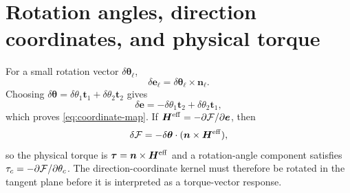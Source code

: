 \section{Rotation angles, direction coordinates, and physical torque}
\label{app:coordinates}

For a small rotation vector $\delta\bm\theta_\ell$,
\begin{equation}
\delta\bm e_\ell=\delta\bm\theta_\ell\times\bm n_\ell.
\end{equation}
Choosing $\delta\bm\theta=\delta\theta_1\bm t_1+\delta\theta_2\bm t_2$ gives
\begin{equation}
\delta\bm e=-\delta\theta_1\bm t_2+\delta\theta_2\bm t_1,
\end{equation}
which proves \cref{eq:coordinate-map}. If $\bm H^{\rm eff}=-\partial\mathcal F/\partial\bm e$, then
\begin{equation}
\delta\mathcal F=-\delta\bm\theta\cdot
(\bm n\times\bm H^{\rm eff}),
\end{equation}
so the physical torque is $\bm\tau=\bm n\times\bm H^{\rm eff}$ and a rotation-angle component satisfies $\tau_c=-\partial\mathcal F/\partial\theta_c$. The direction-coordinate kernel must therefore be rotated in the tangent plane before it is interpreted as a torque-vector response.
